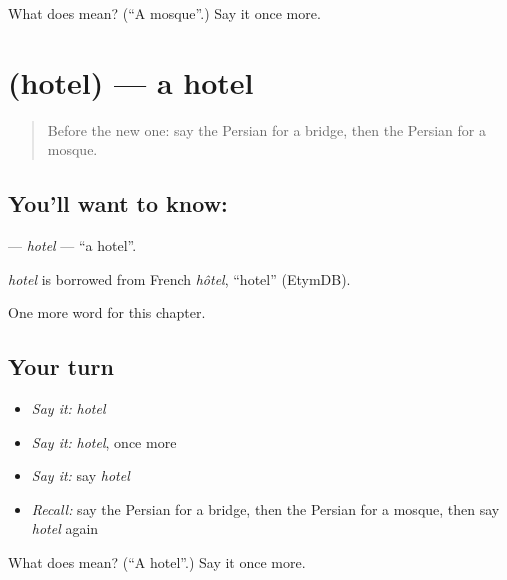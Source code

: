 \begin{tcolorbox}[breakable,colback=teal!4,colframe=teal!35!black,title={Before you move on}]
What does  mean? (\textquotedblleft{}A mosque\textquotedblright{}.) Say it once more.
\end{tcolorbox}
\section[\texorpdfstring{\fa{هتل} (hotel)}{هتل (hotel)}]{ (hotel) — a hotel}

\label{lesson:FA-C71-hotel}



\begin{quote}
Before the new one: say the Persian for a bridge, then the Persian for a mosque.
\end{quote}

\subsection*{You'll want to know: }
\textbf{} — \emph{hotel} — \textquotedblleft{}a hotel\textquotedblright{}.

\begin{cousinweb}
\emph{hotel} is borrowed from French \emph{hôtel}, \textquotedblleft{}hotel\textquotedblright{} (EtymDB).
\end{cousinweb}

\begin{grammarlens}[title={What you've built}]
One more word for this chapter.
\end{grammarlens}

\subsection*{Your turn}
\begin{itemize}
\raggedright
  \item \emph{Say it:} \emph{hotel}
  \item \emph{Say it:} \emph{hotel}, once more
  \item \emph{Say it:} say \emph{hotel}
  \item \emph{Recall:} say the Persian for a bridge, then the Persian for a mosque, then say \emph{hotel} again
\end{itemize}

\begin{tcolorbox}[breakable,colback=teal!4,colframe=teal!35!black,title={Before you move on}]
What does  mean? (\textquotedblleft{}A hotel\textquotedblright{}.) Say it once more.
\end{tcolorbox}
